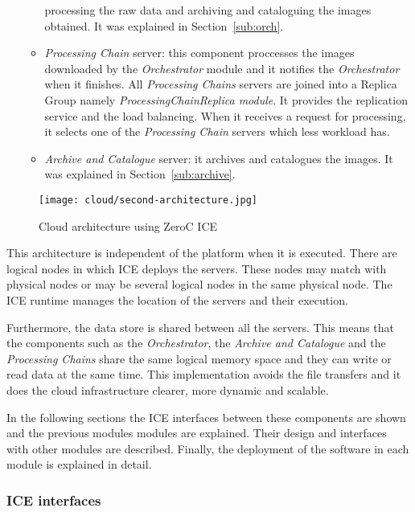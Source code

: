 \begin{itemize}
\begin{itemize}
  processing the raw data and archiving and cataloguing the images obtained. It was explained in Section~\ref{sub:orch}.
\item \emph{Processing Chain} server: this component proccesses the images downloaded by the
  \emph{Orchestrator} module and it notifies the \emph{Orchestrator} when it
  finishes. All \emph{Processing Chains} servers are joined into a Replica Group namely
  \emph{ProcessingChainReplica module}. It provides the replication service and the load
  balancing. When it receives a request for processing, it selects one of the 
  \emph{Processing Chain} servers which less workload has.
\item \emph{Archive and Catalogue} server: it archives and catalogues the images. It was explained in Section~\ref{sub:archive}.
\end{itemize}
\end{itemize}
\begin{figure}[!h]
\begin{center}
\texttt{[image: cloud/second-architecture.jpg]}
\caption{Cloud architecture using ZeroC ICE}
\label{fig:ice-architecture}
\end{center}
\end{figure}


This architecture is independent of the platform when it is executed. There are
logical nodes in which ICE deploys the servers. These nodes may match with
physical nodes or may be several logical nodes in the same physical node. The
ICE runtime manages the location of the servers and their execution.

Furthermore, the data store is shared between all the servers. This means that the
components such as the \emph{Orchestrator}, the \emph{Archive and Catalogue} and the
\emph{Processing Chains} share the same logical memory space and they can write or read data
at the same time. This implementation avoids the file transfers and it does the
cloud infrastructure clearer, more dynamic and scalable.

In the following sections the  ICE interfaces between these components are
shown and the previous modules modules are explained. Their design and
interfaces with other modules are described. Finally, the
deployment of the software in each module is explained in detail.

\subsubsection{ICE interfaces}

